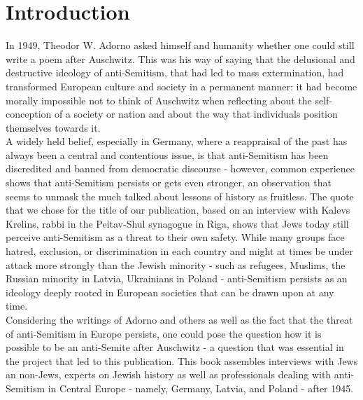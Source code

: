 \section{Introduction}
\vspace*{3em}
In 1949, Theodor W. Adorno asked himself and humanity whether one could still write a poem after Auschwitz. This was his way of saying that the delusional and destructive ideology of anti-Semitism, that had led to mass extermination, had transformed European culture and society in a permanent manner: it had become morally impossible not to think of Auschwitz when reflecting about the self-conception of a society or nation and about the way that individuals position themselves towards it.\\
A widely held belief, especially in Germany, where a reappraisal of the past has always been a central and contentious issue, is that anti-Semitism has been discredited and banned from democratic discourse - however, common experience shows that anti-Semitism persists or gets even stronger, an observation that seems to unmask the much talked about lessons of history as fruitless. The quote that we chose for the title of our publication, based on an interview with Kalevs Krelins, rabbi in the Peitav-Shul synagogue in Riga, shows that Jews today still perceive anti-Semitism as a threat to their own safety. While many groups face hatred, exclusion, or discrimination in each country and might at times be under attack more strongly than the Jewish minority - such as refugees, Muslims, the Russian minority in Latvia, Ukrainians in Poland - anti-Semitism persists as an ideology deeply rooted in European societies that can be drawn upon at any time.\\
Considering the writings of Adorno and others as well as the fact that the threat of anti-Semitism in Europe persists, one could pose the question how it is possible to be an anti-Semite after Auschwitz - a question that was essential in the project that led to this publication. This book assembles interviews with Jews an non-Jews, experts on Jewish history as well as professionals dealing with anti-Semitism in Central Europe - namely, Germany, Latvia, and Poland - after 1945.
